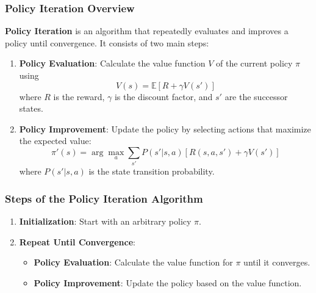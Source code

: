 \documentclass[aspectratio=169]{beamer}
\begin{document}
\begin{frame}[fragile]
    \frametitle{Policy Iteration Overview}
    \textbf{Policy Iteration} is an algorithm that repeatedly evaluates and improves a policy until convergence. It consists of two main steps:
    
    \begin{enumerate}
        \item \textbf{Policy Evaluation}: Calculate the value function $V$ of the current policy $\pi$ using 
        \begin{equation}
            V(s) = \mathbb{E}[R + \gamma V(s')]
        \end{equation}
        where $R$ is the reward, $\gamma$ is the discount factor, and $s'$ are the successor states.
        
        \item \textbf{Policy Improvement}: Update the policy by selecting actions that maximize the expected value:
        \begin{equation}
            \pi'(s) = \arg\max_a \sum_{s'} P(s'|s, a) [R(s, a, s') + \gamma V(s')]
        \end{equation}
        where $P(s'|s, a)$ is the state transition probability.
    \end{enumerate}
\end{frame}

\begin{frame}[fragile]
    \frametitle{Steps of the Policy Iteration Algorithm}
    \begin{enumerate}
        \item \textbf{Initialization}: Start with an arbitrary policy $\pi$.
        \item \textbf{Repeat Until Convergence}:
        \begin{itemize}
            \item \textbf{Policy Evaluation}: Calculate the value function for $\pi$ until it converges.
            \item \textbf{Policy Improvement}: Update the policy based on the value function. 
        \end{itemize}
    \end{enumerate}
\end{frame}
\end{document}
